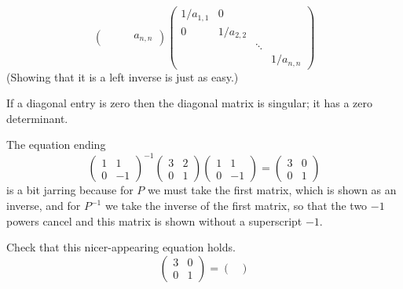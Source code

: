 \begin{exercises}
\begin{answer}
\begin{equation*}
\begin{pmatrix}
                      &       &      &a_{n,n}
          \end{pmatrix}
          \begin{pmatrix}
            1/a_{1,1}  &0                \\
             0        &1/a_{2,2}          \\
                      &       &\ddots    \\
                      &       &      &1/a_{n,n}
          \end{pmatrix}
      \end{equation*}
      (Showing that it is a left inverse is just as easy.)

      If a diagonal entry is zero then the diagonal matrix is
      singular; it has a zero determinant.  
    \end{answer}
  \item 
    The equation ending 
    \begin{equation*}
       \begin{pmatrix}
         1  &1  \\
         0  &-1
       \end{pmatrix}^{-1}
       \begin{pmatrix}
         3  &2  \\
         0  &1
       \end{pmatrix}
       \begin{pmatrix}
         1  &1  \\
         0  &-1
       \end{pmatrix}
       =
       \begin{pmatrix}
         3  &0  \\
         0  &1
       \end{pmatrix}
    \end{equation*}
    is a bit jarring because for $P$ we must take the first matrix,
    which is shown as an inverse, and for $P^{-1}$ we take the inverse of the
    first matrix, so that the two $-1$ powers cancel and this matrix is 
    shown without a superscript $-1$.
    \begin{exparts}
      \partsitem Check that this nicer-appearing equation holds.
        \begin{equation*}
           \begin{pmatrix}
             3  &0  \\
             0  &1
           \end{pmatrix}
           =
           \begin{pmatrix}

\end{pmatrix}
\end{equation*}
\end{exparts}
\end{exercises}
